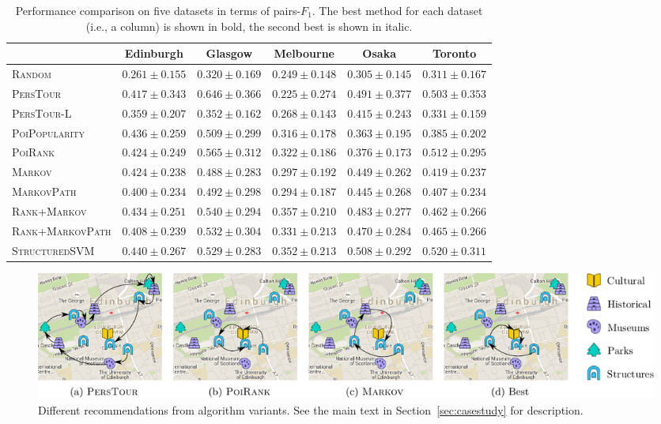 \begin{table}[t]
\caption{Performance comparison on five datasets in terms of pairs-$F_1$.
         The best method for each dataset (i.e., a column) is shown in bold, the second best is shown in italic.}
\label{tab:pairf1}
\centering
\begin{tabular}{l|ccccc} \hline
 & Edinburgh & Glasgow & Melbourne & Osaka & Toronto \\ \hline
\textsc{Random} & $0.261\pm0.155$ & $0.320\pm0.169$ & $0.249\pm0.148$ & $0.305\pm0.145$ & $0.311\pm0.167$ \\
\textsc{PersTour}\cite{ijcai15} & $0.417\pm0.343$ & $\mathbf{0.646\pm0.366}$ & $0.225\pm0.274$ & $\mathit{0.491\pm0.377}$ & $0.503\pm0.353$ \\
\textsc{PersTour-L} & $0.359\pm0.207$ & $0.352\pm0.162$ & $0.268\pm0.143$ & $0.415\pm0.243$ & $0.331\pm0.159$ \\
\textsc{PoiPopularity} & $\mathit{0.436\pm0.259}$ & $0.509\pm0.299$ & $0.316\pm0.178$ & $0.363\pm0.195$ & $0.385\pm0.202$ \\
\textsc{PoiRank} & $0.424\pm0.249$ & $\mathit{0.565\pm0.312}$ & $0.322\pm0.186$ & $0.376\pm0.173$ & $\mathit{0.512\pm0.295}$ \\
\textsc{Markov} & $0.424\pm0.238$ & $0.488\pm0.283$ & $0.297\pm0.192$ & $0.449\pm0.262$ & $0.419\pm0.237$ \\
\textsc{MarkovPath} & $0.400\pm0.234$ & $0.492\pm0.298$ & $0.294\pm0.187$ & $0.445\pm0.268$ & $0.407\pm0.234$ \\
\textsc{Rank+Markov} & $0.434\pm0.251$ & $0.540\pm0.294$ & $\mathbf{0.357\pm0.210}$ & $0.483\pm0.277$ & $0.462\pm0.266$ \\
\textsc{Rank+MarkovPath} & $0.408\pm0.239$ & $0.532\pm0.304$ & $0.331\pm0.213$ & $0.470\pm0.284$ & $0.465\pm0.266$ \\
\textsc{StructuredSVM} & $\mathbf{0.440\pm0.267}$ & $0.529\pm0.283$ & $\mathit{0.352\pm0.213}$ & $\mathbf{0.508\pm0.292}$ & $\mathbf{0.520\pm0.311}$ \\
\hline
\end{tabular}
\end{table}


\begin{figure}[t]
	\centering
	\includegraphics[width=\textwidth]{fig/example-tour.pdf}
	\caption{Different recommendations from algorithm variants. 
    See the main text in Section~\ref{sec:casestudy} for description.}
	\label{fig:exampleresult}
\end{figure}


